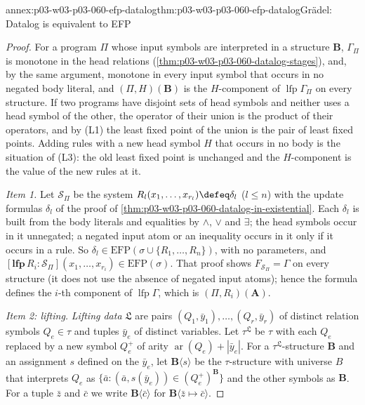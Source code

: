 \begin{annexitem}{annex:p03-w03-p03-060-efp-datalog}{thm:p03-w03-p03-060-efp-datalog}{Gr\"adel: Datalog is equivalent to EFP}
\begin{proof}
For a program \(\Pi\) whose input symbols are interpreted in a structure
\(\mathbf B\), \(\Gamma_\Pi\) is monotone in the head relations
(\cref{thm:p03-w03-p03-060-datalog-stages}), and, by the same argument,
monotone in every input symbol that occurs in no negated body literal, and
\((\Pi,H)(\mathbf B)\) is the \(H\)-component of
\(\operatorname{lfp}\Gamma_\Pi\) on every structure. If two programs have
disjoint sets of head symbols and neither uses a head symbol of the other,
the operator of their union is the product of their operators, and by
(L1) the least fixed point of the union is the pair of least fixed points.
Adding rules with a new head symbol \(H\) that occurs in no body is the
situation of (L3): the old least fixed point is unchanged and the
\(H\)-component is the value of the new rules at it.

\emph{Item 1.} Let \(\mathcal S_\Pi\) be the system
\(R_l(x_1,\ldots,x_{r_l})\defeq\delta_l\) (\(l\le n\)) with the update
formulas \(\delta_l\) of the proof of
\cref{thm:p03-w03-p03-060-datalog-in-existential}. Each \(\delta_l\) is
built from the body literals and equalities by \(\wedge\), \(\vee\) and
\(\exists\); the head symbols occur in it unnegated; a negated input atom
or an inequality occurs in it only if it occurs in a rule. So
\(\delta_l\in\mathrm{EFP}(\sigma\cup\{R_1,\ldots,R_n\})\), with no
parameters, and
\([\mathbf{lfp}\,R_i:\mathcal S_\Pi](x_1,\ldots,x_{r_i})\in\mathrm{EFP}(\sigma)\).
That proof shows \(F_{\mathcal S_\Pi}=\Gamma\) on every structure (it does
not use the absence of negated input atoms); hence the formula defines the
\(i\)-th component of \(\operatorname{lfp}\Gamma\), which is
\((\Pi,R_i)(\mathbf A)\).

\emph{Item 2: lifting.} \emph{Lifting data} \(\mathfrak L\) are pairs
\((Q_1,\bar y_1),\ldots,(Q_r,\bar y_r)\) of distinct relation symbols
\(Q_e\in\tau\) and tuples \(\bar y_e\) of distinct variables. Let
\(\tau^{\mathfrak L}\) be \(\tau\) with each \(Q_e\) replaced by a new
symbol \(Q_e^+\) of arity \(\operatorname{ar}(Q_e)+|\bar y_e|\). For a
\(\tau^{\mathfrak L}\)-structure \(\mathbf B\) and an assignment \(s\)
defined on the \(\bar y_e\), let \(\mathbf B\langle s\rangle\) be the
\(\tau\)-structure with universe \(B\) that interprets \(Q_e\) as
\(\{\bar a:(\bar a,s(\bar y_e))\in(Q_e^+)^{\mathbf B}\}\) and the other
symbols as \(\mathbf B\). For a tuple \(\bar z\) and \(\bar c\) we write
\(\mathbf B\langle\bar c\rangle\) for \(\mathbf B\langle\bar z\mapsto\bar c\rangle\).


\end{proof}
\end{annexitem}
